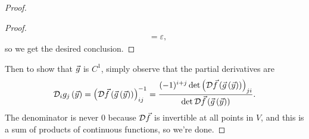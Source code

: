 \documentclass[main.tex]{subfiles}
\begin{document}
\begin{proof}
\begin{proof}
\begin{align*}
            &= \varepsilon,
        \end{align*}
        so we get the desired conclusion.
    \end{proof}
    Then to show that $\vec{g}$ is $C^1$, simply observe that the partial derivatives are
    \[\mathcal{D}_ig_j\left( \vec{y} \right) = \left( \mathcal{D}\vec{f}\left( \vec{g}\left( \vec{y} \right) \right) \right)^{-1}_{ij} = \frac{(-1)^{i + j}\det \left( \mathcal{D}\vec{f}\left( \vec{g}\left( \vec{y} \right) \right) \right)_{ji}}{\det \mathcal{D}\vec{f}\left( \vec{g}\left( \vec{y} \right) \right)}.\]
    The denominator is never $0$ because $\mathcal{D}\vec{f}$ is invertible at all points in $V$, and this is a sum of products of continuous functions, so we're done.
\end{proof}
\end{document}
